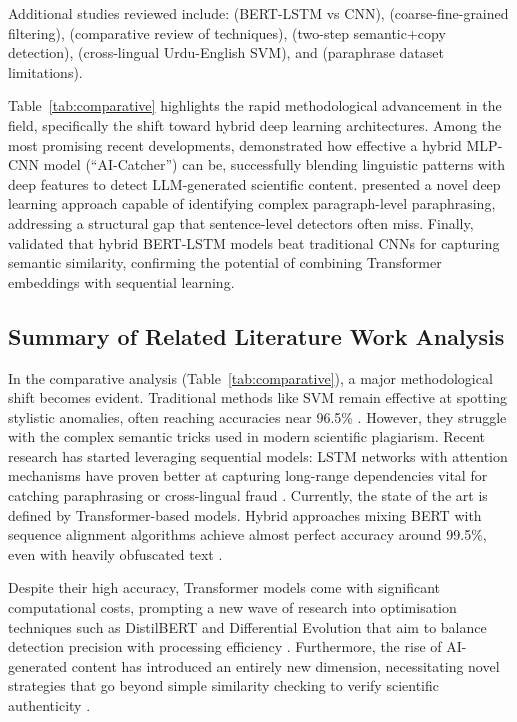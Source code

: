 \documentclass[12pt, a4paper]{article}
\begin{document}
Additional studies reviewed include: \citet{Asalkar2025} (BERT-LSTM vs CNN), \citet{Chang2023} (coarse-fine-grained filtering), \citet{Sajid2025} (comparative review of techniques), \citet{Setu2025} (two-step semantic+copy detection), \citet{Zahid2023} (cross-lingual Urdu-English SVM), and \citet{Zhou2024} (paraphrase dataset limitations).

Table~\ref{tab:comparative} highlights the rapid methodological advancement in the field, specifically the shift toward hybrid deep learning architectures. Among the most promising recent developments, \citet{Alhijawi2025} demonstrated how effective a hybrid MLP-CNN model (``AI-Catcher'') can be, successfully blending linguistic patterns with deep features to detect LLM-generated scientific content. \citet{Saqaabi2025} presented a novel deep learning approach capable of identifying complex paragraph-level paraphrasing, addressing a structural gap that sentence-level detectors often miss. Finally, \citet{Asalkar2025} validated that hybrid BERT-LSTM models beat traditional CNNs for capturing semantic similarity, confirming the potential of combining Transformer embeddings with sequential learning.

\subsection{Summary of Related Literature Work Analysis}

In the comparative analysis (Table~\ref{tab:comparative}), a major methodological shift becomes evident. Traditional methods like SVM remain effective at spotting stylistic anomalies, often reaching accuracies near 96.5\% \citep{ElRashidy2024}. However, they struggle with the complex semantic tricks used in modern scientific plagiarism. Recent research has started leveraging sequential models: LSTM networks with attention mechanisms have proven better at capturing long-range dependencies vital for catching paraphrasing or cross-lingual fraud \citep{Bao2024, Bouaine2023}. Currently, the state of the art is defined by Transformer-based models. Hybrid approaches mixing BERT with sequence alignment algorithms achieve almost perfect accuracy around 99.5\%, even with heavily obfuscated text \citep{Antonius2023}.

Despite their high accuracy, Transformer models come with significant computational costs, prompting a new wave of research into optimisation techniques such as DistilBERT and Differential Evolution that aim to balance detection precision with processing efficiency \citep{JingLiu2023, Moravvej2023}. Furthermore, the rise of AI-generated content has introduced an entirely new dimension, necessitating novel strategies that go beyond simple similarity checking to verify scientific authenticity \citep{Alhijawi2025, Murch2025}.
\end{document}
